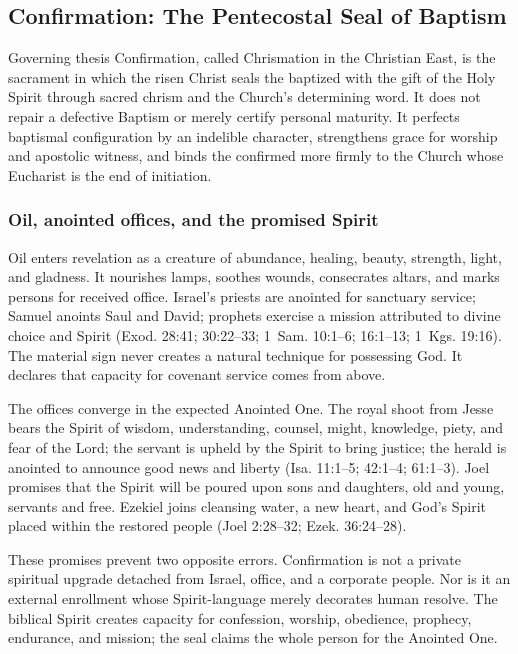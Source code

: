 \subsection{Confirmation: The Pentecostal Seal of Baptism}

\begin{studybox}{Governing thesis}
Confirmation, called Chrismation in the Christian East, is the sacrament in which the risen Christ seals the baptized with the gift of the Holy Spirit through sacred chrism and the Church's determining word. It does not repair a defective Baptism or merely certify personal maturity. It perfects baptismal configuration by an indelible character, strengthens grace for worship and apostolic witness, and binds the confirmed more firmly to the Church whose Eucharist is the end of initiation.
\end{studybox}

\subsubsection{Oil, anointed offices, and the promised Spirit}

Oil enters revelation as a creature of abundance, healing, beauty, strength, light, and gladness. It nourishes lamps, soothes wounds, consecrates altars, and marks persons for received office. Israel's priests are anointed for sanctuary service; Samuel anoints Saul and David; prophets exercise a mission attributed to divine choice and Spirit (Exod. 28:41; 30:22--33; 1~Sam. 10:1--6; 16:1--13; 1~Kgs. 19:16). The material sign never creates a natural technique for possessing God. It declares that capacity for covenant service comes from above.

The offices converge in the expected Anointed One. The royal shoot from Jesse bears the Spirit of wisdom, understanding, counsel, might, knowledge, piety, and fear of the Lord; the servant is upheld by the Spirit to bring justice; the herald is anointed to announce good news and liberty (Isa. 11:1--5; 42:1--4; 61:1--3). Joel promises that the Spirit will be poured upon sons and daughters, old and young, servants and free. Ezekiel joins cleansing water, a new heart, and God's Spirit placed within the restored people (Joel 2:28--32; Ezek. 36:24--28).

These promises prevent two opposite errors. Confirmation is not a private spiritual upgrade detached from Israel, office, and a corporate people. Nor is it an external enrollment whose Spirit-language merely decorates human resolve. The biblical Spirit creates capacity for confession, worship, obedience, prophecy, endurance, and mission; the seal claims the whole person for the Anointed One.

